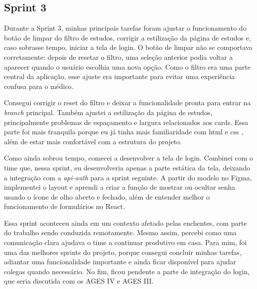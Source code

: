 \subsection{Sprint 3}

Durante a Sprint 3, minhas principais tarefas foram ajustar o funcionamento do botão de limpar do filtro de estudos, corrigir a estilização da página de estudos e, caso sobrasse tempo, iniciar a tela de login. O botão de limpar não se comportava corretamente: depois de resetar o filtro, uma seleção anterior podia voltar a aparecer quando o usuário escolhia uma nova opção. Como o filtro era uma parte central da aplicação, esse ajuste era importante para evitar uma experiência confusa para o médico.

Consegui corrigir o reset do filtro e deixar a funcionalidade pronta para entrar na \textit{branch} principal. Também ajustei a estilização da página de estudos, principalmente problemas de espaçamento e largura relacionados aos cards. Essa parte foi mais tranquila porque eu já tinha mais familiaridade com \ac{html} \cite{html} e \ac{css} \cite{css}, além de estar mais confortável com a estrutura do projeto.

Como ainda sobrou tempo, comecei a desenvolver a tela de login. Combinei com o time que, nessa sprint, eu desenvolveria apenas a parte estática da tela, deixando a integração com a \textit{api-auth} para a sprint seguinte. A partir do modelo no Figma, implementei o layout e aprendi a criar a função de mostrar ou ocultar senha usando o ícone de olho aberto e fechado, além de entender melhor o funcionamento de formulários no React.

Essa sprint aconteceu ainda em um contexto afetado pelas enchentes, com parte do trabalho sendo conduzida remotamente. Mesmo assim, percebi como uma comunicação clara ajudava o time a continuar produtivo em casa. Para mim, foi uma das melhores sprints do projeto, porque consegui concluir minhas tarefas, adiantar uma funcionalidade importante e ainda ficar disponível para ajudar colegas quando necessário. No fim, ficou pendente a parte de integração do login, que seria discutida com os AGES IV e AGES III. 
